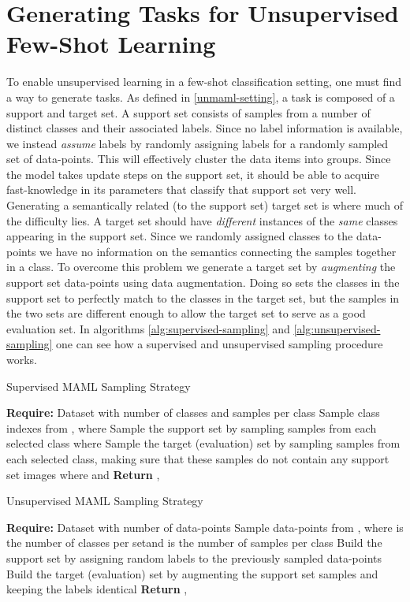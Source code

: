 \documentclass{article}
\begin{document}
\section{Generating Tasks for Unsupervised Few-Shot Learning}\label{unmaml}
To enable unsupervised learning in a few-shot classification setting, one must find a way to generate tasks. As defined in \ref{unmaml-setting}, a task is composed of a support and target set. A support set consists of samples from a number of distinct classes and their associated labels. Since no label information is available, we instead \emph{assume} labels by randomly assigning labels for a randomly sampled set of data-points. This will effectively cluster the data items into groups. Since the model takes update steps on the support set, it should be able to acquire fast-knowledge in its parameters that classify that support set very well. Generating a semantically related (to the support set) target set is where much of the difficulty lies. A target set should have \emph{different} instances of the \emph{same} classes appearing in the support set. Since we randomly assigned classes to the data-points we have no information on the semantics connecting the samples together in a class. To overcome this problem we generate a target set by \emph{augmenting} the support set data-points using data augmentation. Doing so sets the classes in the support set to perfectly match to the classes in the target set, but the samples in the two sets are different enough to allow the target set to serve as a good evaluation set. In algorithms \ref{alg:supervised-sampling} and \ref{alg:unsupervised-sampling} one can see how a supervised and unsupervised sampling procedure works.

\begin{algorithm}[]
	\caption{Supervised MAML Sampling Strategy}\label{alg:supervised-sampling}
	\begin{algorithmic}[1]
    	\STATE \textbf{Require:} Dataset  with  number of classes and  samples per class
		\STATE Sample  class indexes from , where 
        \STATE Sample the support set  by sampling  samples from each selected class where 
        \STATE Sample the target (evaluation) set  by sampling  samples from each selected class, making sure that these samples do not contain any support set images  where  and 
        \STATE \textbf{Return} , 
	\end{algorithmic}
\end{algorithm}

\begin{algorithm}[]
	\caption{Unsupervised MAML Sampling Strategy}\label{alg:unsupervised-sampling}
	\begin{algorithmic}[1]
    	\STATE \textbf{Require:} Dataset  with  number of data-points
		\STATE Sample  data-points from , where  is the number of classes per set\footnotemark and  is the number of samples per class 
        \STATE Build the support set  by assigning random labels to the previously  sampled data-points
        \STATE Build the target (evaluation) set  by augmenting the support set  samples and keeping the labels identical
        \STATE \textbf{Return} , 
	\end{algorithmic}
\end{algorithm}
\end{document}
